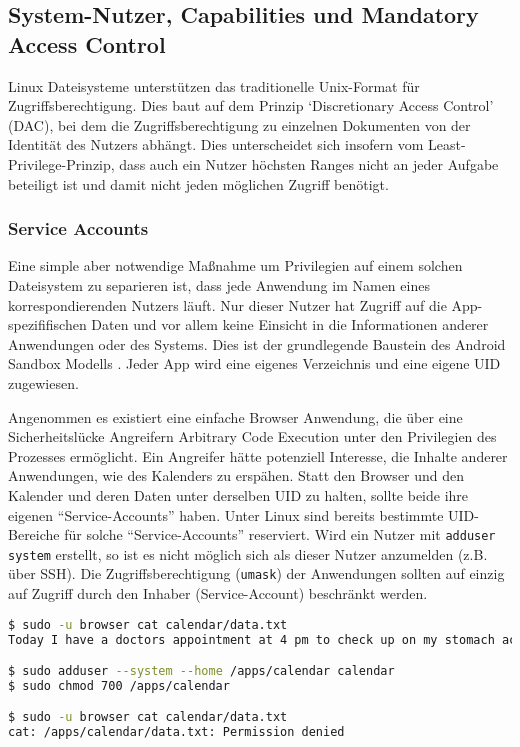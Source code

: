 \subsection{System-Nutzer, Capabilities und Mandatory Access Control}

Linux Dateisysteme unterstützen das traditionelle Unix-Format für Zugriffsberechtigung. Dies baut auf dem Prinzip `Discretionary Access Control' (DAC), bei dem die Zugriffsberechtigung zu einzelnen Dokumenten von der Identität des Nutzers abhängt. Dies unterscheidet sich insofern vom Least-Privilege-Prinzip, dass auch ein Nutzer höchsten Ranges nicht an jeder Aufgabe beteiligt ist und damit nicht jeden möglichen Zugriff benötigt.


\subsubsection{Service Accounts}

Eine simple aber notwendige Maßnahme um Privilegien auf einem solchen Dateisystem zu separieren ist, dass jede Anwendung im Namen eines korrespondierenden Nutzers läuft. Nur dieser Nutzer hat Zugriff auf die App-spezififischen Daten und vor allem keine Einsicht in die Informationen anderer Anwendungen oder des Systems. Dies ist der grundlegende Baustein des Android Sandbox Modells \cite{android-sandbox}. Jeder App wird eine eigenes Verzeichnis und eine eigene UID zugewiesen.

Angenommen es existiert eine einfache Browser Anwendung, die über eine Sicherheitslücke Angreifern Arbitrary Code Execution unter den Privilegien des Prozesses ermöglicht. Ein Angreifer hätte potenziell Interesse, die Inhalte anderer Anwendungen, wie des Kalenders zu erspähen.
Statt den Browser und den Kalender und deren Daten unter derselben UID zu halten, sollte beide ihre eigenen ``Service-Accounts'' haben. Unter Linux sind bereits bestimmte UID-Bereiche für solche ``Service-Accounts'' reserviert. Wird ein Nutzer mit \texttt{adduser \-\-system} erstellt, so ist es nicht möglich sich als dieser Nutzer anzumelden (z.B. über SSH). Die Zugriffsberechtigung (\texttt{umask}) der Anwendungen sollten auf einzig auf Zugriff durch den Inhaber (Service-Account) beschränkt werden.

\begin{lstlisting}[language=bash]
$ sudo -u browser cat calendar/data.txt
Today I have a doctors appointment at 4 pm to check up on my stomach aches.

$ sudo adduser --system --home /apps/calendar calendar
$ sudo chmod 700 /apps/calendar

$ sudo -u browser cat calendar/data.txt
cat: /apps/calendar/data.txt: Permission denied
\end{lstlisting}

